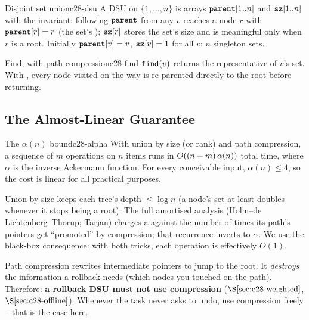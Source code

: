 \begin{definition}{Disjoint set union}{c28-dsu}
A DSU on \(\{1,\dots,n\}\) is arrays \(\texttt{parent}[1..n]\) and
\(\texttt{sz}[1..n]\) with the invariant: following \(\texttt{parent}\) from any
\(v\) reaches a node \(r\) with \(\texttt{parent}[r]=r\) (the set's
); \(\texttt{sz}[r]\) stores the set's size and is
meaningful only when \(r\) is a root.  Initially \(\texttt{parent}[v]=v\),
\(\texttt{sz}[v]=1\) for all \(v\): \(n\) singleton sets.
\end{definition}

\begin{definition}{Find, with path compression}{c28-find}
\(\texttt{find}(v)\) returns the representative of \(v\)'s set.  With
, every node visited on the way is re-parented
directly to the root before returning.
\end{definition}

\subsection{The Almost-Linear Guarantee}

\begin{proposition}{The \(\alpha(n)\) bound}{c28-alpha}
With union by size (or rank) and path compression, a sequence of \(m\)
operations on \(n\) items runs in \(O((n+m)\,\alpha(n))\) total time,
where \(\alpha\) is the inverse Ackermann function.  For every conceivable
input, \(\alpha(n)\le 4\), so the cost is linear for all practical purposes.
\end{proposition}
\begin{proofbox}
Union by size keeps each tree's depth \(\le\log n\) (a node's set at least
doubles whenever it stops being a root).  The full amortised analysis
(Holm--de Lichtenberg--Thorup; Tarjan) charges a  against the
number of times its path's pointers get ``promoted'' by compression; that
recurrence inverts to \(\alpha\).  We use the black-box consequence: with both
tricks, each operation is effectively \(O(1)\).
\end{proofbox}

\begin{warningbox}
Path compression rewrites intermediate  pointers to jump to the
root.  It \emph{destroys} the information a rollback needs (which nodes you
touched on the path).  Therefore: \textbf{a rollback DSU must not use
compression} (\(\secref{c28-weighted}\), \(\secref{c28-offline}\)).  Whenever
the task never asks to undo, use compression freely -- that is the case here.
\end{warningbox}

